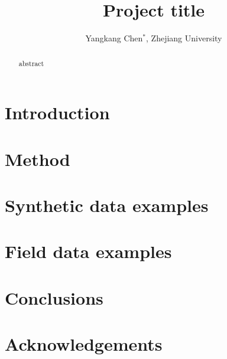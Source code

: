 \title{Project title}

\author{Yangkang Chen$^*$, Zhejiang University}

\maketitle

\begin{abstract}
abstract
\end{abstract}

\section{Introduction}

\section{Method}

\section{Synthetic data examples}

\section{Field data examples}

 
\section{Conclusions}


\section{Acknowledgements}


\onecolumn






